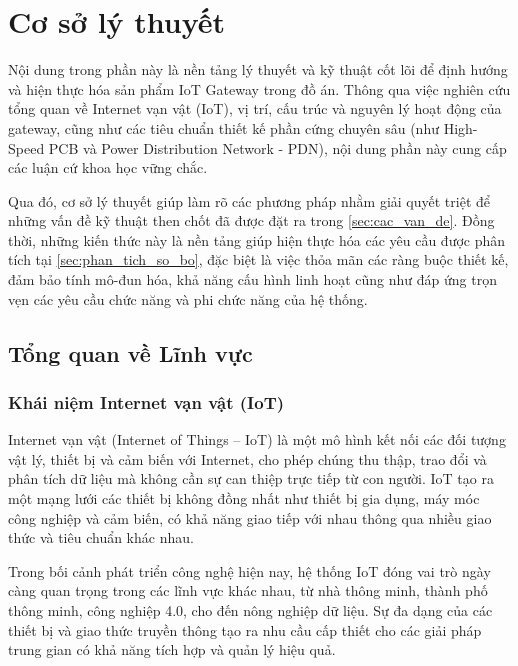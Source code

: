 \section{Cơ sở lý thuyết}
    Nội dung trong phần này là nền tảng lý thuyết và kỹ thuật cốt lõi để định hướng và hiện thực hóa sản phẩm IoT Gateway trong đồ án. Thông qua việc nghiên cứu tổng quan về Internet vạn vật (IoT), vị trí, cấu trúc và nguyên lý hoạt động của gateway, cũng như các tiêu chuẩn thiết kế phần cứng chuyên sâu (như High-Speed PCB và Power Distribution Network - PDN), nội dung phần này cung cấp các luận cứ khoa học vững chắc.
    
    Qua đó, cơ sở lý thuyết giúp làm rõ các phương pháp nhằm giải quyết triệt để những vấn đề kỹ thuật then chốt đã được đặt ra trong \autoref{sec:cac_van_de}. Đồng thời, những kiến thức này là nền tảng giúp hiện thực hóa các yêu cầu được phân tích tại \autoref{sec:phan_tich_so_bo}, đặc biệt là việc thỏa mãn các ràng buộc thiết kế, đảm bảo tính mô-đun hóa, khả năng cấu hình linh hoạt cũng như đáp ứng trọn vẹn các yêu cầu chức năng và phi chức năng của hệ thống.
    \subsection{Tổng quan về Lĩnh vực}
        \subsubsection{Khái niệm Internet vạn vật (IoT)}
            Internet vạn vật (Internet of Things – IoT) là một mô hình kết nối các đối tượng vật lý, thiết bị và cảm biến với Internet, cho phép chúng thu thập, trao đổi và phân tích dữ liệu mà không cần sự can thiệp trực tiếp từ con người. IoT tạo ra một mạng lưới các thiết bị không đồng nhất như thiết bị gia dụng, máy móc công nghiệp và cảm biến, có khả năng giao tiếp với nhau thông qua nhiều giao thức và tiêu chuẩn khác nhau.

            Trong bối cảnh phát triển công nghệ hiện nay, hệ thống IoT đóng vai trò ngày càng quan trọng trong các lĩnh vực khác nhau, từ nhà thông minh, thành phố thông minh, công nghiệp 4.0, cho đến nông nghiệp dữ liệu. Sự đa dạng của các thiết bị và giao thức truyền thông tạo ra nhu cầu cấp thiết cho các giải pháp trung gian có khả năng tích hợp và quản lý hiệu quả.


